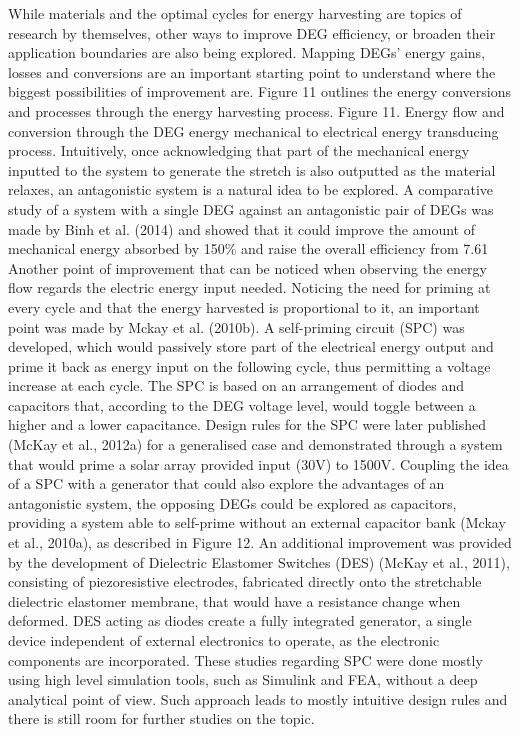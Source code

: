 		While materials and the optimal cycles for energy harvesting are topics of research by themselves, other ways to improve DEG efficiency, or broaden their application boundaries are also being explored. Mapping DEGs’ energy gains, losses and conversions are an important starting point to understand where the biggest possibilities of improvement are. Figure 11 outlines the energy conversions and processes through the energy harvesting process. 
Figure 11. Energy flow and conversion through the DEG energy mechanical to electrical energy transducing process.
Intuitively, once acknowledging that part of the mechanical energy inputted to the system to generate the stretch is also outputted as the material relaxes, an antagonistic system is a natural idea to be explored. A comparative study of a system with a single DEG against an antagonistic pair of DEGs was made by Binh et al. (2014) and showed that it could improve the amount of mechanical energy absorbed by 150\% and raise the overall efficiency from 7.61%
 	Another point of improvement that can be noticed when observing the energy flow regards the electric energy input needed. Noticing the need for priming at every cycle and that the energy harvested is proportional to it, an important point was made by Mckay et al. (2010b). A self-priming circuit (SPC) was developed, which would passively store part of the electrical energy output and prime it back as energy input on the following cycle, thus permitting a voltage increase at each cycle. The SPC is based on an arrangement of diodes and capacitors that, according to the DEG voltage level, would toggle between a higher and a lower capacitance. Design rules for the SPC were later published (McKay et al., 2012a) for a generalised case and demonstrated through a system that would prime a solar array provided input (30V) to 1500V. 
	Coupling the idea of a SPC with a generator that could also explore the advantages of an antagonistic system, the opposing DEGs could be explored as capacitors, providing a system able to self-prime without an external capacitor bank (Mckay et al., 2010a), as described in Figure 12. An additional improvement was provided by the development of Dielectric Elastomer Switches (DES) (McKay et al., 2011), consisting of piezoresistive electrodes, fabricated directly onto the stretchable dielectric elastomer membrane, that would have a resistance change when deformed. DES acting as diodes create a fully integrated generator, a single device independent of external electronics to operate, as the electronic components are incorporated. These studies regarding SPC were done mostly using high level simulation tools, such as Simulink and FEA, without a deep analytical point of view. Such approach leads to mostly intuitive design rules and there is still room for further studies on the topic.
